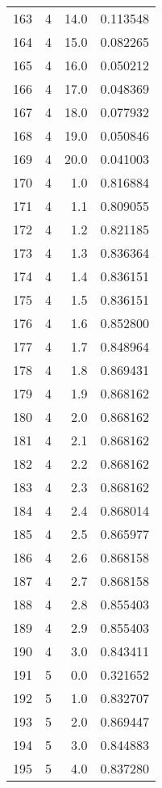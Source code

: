 \begin{tabular}{lrrr}
163 &        4 &     14.0 &  0.113548 \\
164 &        4 &     15.0 &  0.082265 \\
165 &        4 &     16.0 &  0.050212 \\
166 &        4 &     17.0 &  0.048369 \\
167 &        4 &     18.0 &  0.077932 \\
168 &        4 &     19.0 &  0.050846 \\
169 &        4 &     20.0 &  0.041003 \\
170 &        4 &      1.0 &  0.816884 \\
171 &        4 &      1.1 &  0.809055 \\
172 &        4 &      1.2 &  0.821185 \\
173 &        4 &      1.3 &  0.836364 \\
174 &        4 &      1.4 &  0.836151 \\
175 &        4 &      1.5 &  0.836151 \\
176 &        4 &      1.6 &  0.852800 \\
177 &        4 &      1.7 &  0.848964 \\
178 &        4 &      1.8 &  0.869431 \\
179 &        4 &      1.9 &  0.868162 \\
180 &        4 &      2.0 &  0.868162 \\
181 &        4 &      2.1 &  0.868162 \\
182 &        4 &      2.2 &  0.868162 \\
183 &        4 &      2.3 &  0.868162 \\
184 &        4 &      2.4 &  0.868014 \\
185 &        4 &      2.5 &  0.865977 \\
186 &        4 &      2.6 &  0.868158 \\
187 &        4 &      2.7 &  0.868158 \\
188 &        4 &      2.8 &  0.855403 \\
189 &        4 &      2.9 &  0.855403 \\
190 &        4 &      3.0 &  0.843411 \\
191 &        5 &      0.0 &  0.321652 \\
192 &        5 &      1.0 &  0.832707 \\
193 &        5 &      2.0 &  0.869447 \\
194 &        5 &      3.0 &  0.844883 \\
195 &        5 &      4.0 &  0.837280 \\

\end{tabular}
